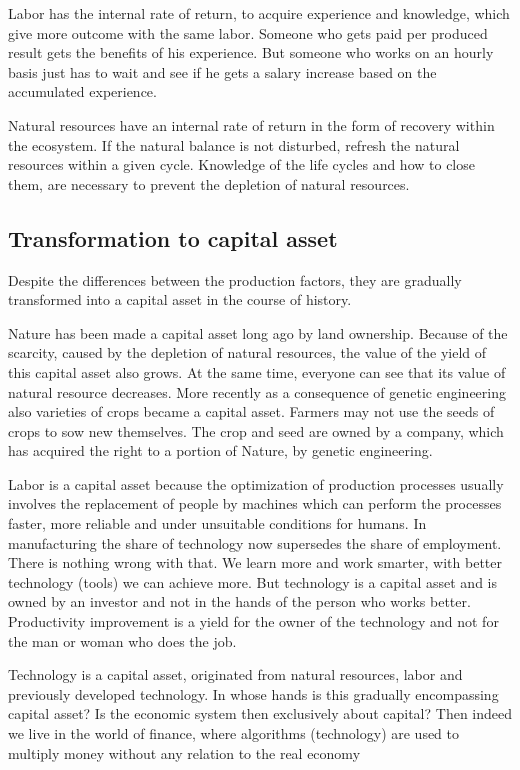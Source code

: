 \documentclass[11pt]{article}
\begin{document}
Labor has the internal rate of return, to acquire experience and knowledge, which give more outcome with the same labor. Someone who gets paid per produced result gets the benefits of his experience. But someone who works on an hourly basis just has to wait and see if he gets a salary increase based on the accumulated experience.

Natural resources have an internal rate of return in the form of recovery within the ecosystem. If the natural balance is not disturbed, refresh the natural resources within a given cycle. Knowledge of the life cycles and how to close them, are necessary to prevent the depletion of natural resources.

\subsection{Transformation to capital asset}
\label{sec:org226527e}

Despite the differences between the production factors, they are gradually transformed into a capital asset in the course of history.

Nature has been made a capital asset long ago by land ownership. Because of the scarcity, caused by the depletion of natural resources, the value of the yield of this capital asset also grows. At the same time, everyone can see that its value of natural resource decreases. More recently as a consequence of genetic engineering also varieties of crops became a capital asset. Farmers may not use the seeds of crops to sow new themselves. The crop and seed are owned by a company, which has acquired the right to a portion of Nature, by genetic engineering.

Labor is a capital asset because the optimization of production processes usually involves the replacement of people by machines which can perform the processes faster, more reliable and under unsuitable conditions for humans. In manufacturing the share of technology now supersedes the share of employment. There is nothing wrong with that. We learn more and work smarter, with better technology (tools) we can achieve more. But technology is a capital asset and is owned by an investor and not in the hands of the person who works better. Productivity improvement is a yield for the owner of the technology and not for the man or woman who does the job.

Technology is a capital asset, originated from natural resources, labor and previously developed technology. In whose hands is this gradually encompassing capital asset? Is the economic system then exclusively about capital? Then indeed we live in the world of finance, where algorithms (technology) are used to multiply money without any relation to the real economy
\end{document}
